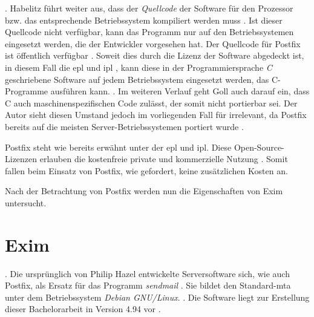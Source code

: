  \citep[][26]{Habelitz2016}.
Habelitz führt weiter aus, dass der \textit{Quellcode} der Software für den Prozessor bzw. das entsprechende Betriebssystem kompiliert werden muss \citep[vgl.][27]{Habelitz2016}. 
Ist dieser Quellcode nicht verfügbar, kann das Programm nur auf den Betriebssystemen eingesetzt werden, die der Entwickler vorgesehen hat. 
Der Quellcode für Postfix ist öffentlich verfügbar \citep[vgl.][]{postfixsource}. 
Soweit dies durch die Lizenz der Software abgedeckt ist, in diesem Fall die \ac{epl} und \ac{ipl} \citep[vgl.][]{postfixsource}, kann diese in der Programmiersprache \textit{C} geschriebene Software auf jedem Betriebssystem eingesetzt werden, das C-Programme ausführen kann.
 \citep[][6]{Goll2014}. Im weiteren Verlauf geht Goll auch darauf ein, dass C auch maschinenspezifischen Code zulässt, der somit nicht portierbar sei. Der Autor sieht diesen Umstand jedoch im vorliegenden Fall für irrelevant, da Postfix bereits auf die meisten Server-Betriebssystemen portiert wurde \citep[vgl.][]{postfixpackages}.

Postfix steht wie bereits erwähnt unter der \ac{epl} und \ac{ipl}. Diese Open-Source-Lizenzen erlauben die kostenfreie private und kommerzielle Nutzung \citep[vgl.][]{postfixlizenz}. Somit fallen beim Einsatz von Postfix, wie gefordert, keine zusätzlichen Kosten an.

Nach der Betrachtung von Postfix werden nun die Eigenschaften von Exim untersucht.

\section{Exim}

 \citep[][]{eximhome}. Die ursprünglich von Philip Hazel entwickelte Serversoftware sich, wie auch Postfix, als Ersatz für das Programm \textit{sendmail} \citep[vgl.][]{eximhome}. Sie bildet den Standard-\ac{mta} unter dem Betriebssystem \textit{Debian GNU/Linux}.  \citep[][]{debianwiki}. Die Software liegt zur Erstellung dieser Bachelorarbeit in Version 4.94 vor \citep[vgl.][]{eximgit}.

